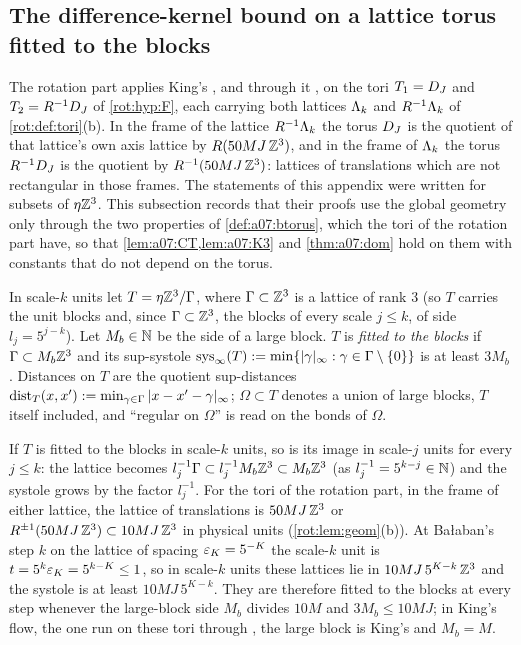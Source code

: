 
\subsection{The difference-kernel bound on a lattice torus fitted to the blocks}\label{ssec:a07:torus}

The rotation part applies King's \cite[Thm.~3.1]{K1}, and through it \BALint, on the tori $T_1=D_J$ and $T_2=R^{-1}D_J$ of \cref{rot:hyp:F}, each carrying both lattices $\Lambda_k$ and $R^{-1}\Lambda_k$ of \cref{rot:def:tori}(b). In the frame of the lattice $R^{-1}\Lambda_k$ the torus $D_J$ is the quotient of that lattice's own axis lattice by $R(50MJ\,\mathbb Z^3)$, and in the frame of $\Lambda_k$ the torus $R^{-1}D_J$ is the quotient by $R^{-1}(50MJ\,\mathbb Z^3)$: lattices of translations which are not rectangular in those frames. The statements of this appendix were written for subsets of $\eta\mathbb Z^3$. This subsection records that their proofs use the global geometry only through the two properties of \cref{def:a07:btorus}, which the tori of the rotation part have, so that \cref{lem:a07:CT,lem:a07:K3} and \cref{thm:a07:dom} hold on them with constants that do not depend on the torus.

\begin{definition}\label{def:a07:btorus}
In scale-$k$ units let $T=\eta\mathbb Z^3/\Gamma$, where $\Gamma\subset\mathbb Z^3$ is a lattice of rank $3$ (so $T$ carries the unit blocks and, since $\Gamma\subset\mathbb Z^3$, the blocks of every scale $j\le k$, of side $l_j=5^{j-k}$). Let $M_b\in\mathbb N$ be the side of a large block. $T$ is \emph{fitted to the blocks} if $\Gamma\subset M_b\mathbb Z^3$ and its sup-systole $\mathrm{sys}_\infty(T):=\min\{|\gamma|_\infty:\gamma\in\Gamma\setminus\{0\}\}$ is at least $3M_b$. Distances on $T$ are the quotient sup-distances $\operatorname{dist}_T(x,x'):=\min_{\gamma\in\Gamma}|x-x'-\gamma|_\infty$; $\Omega\subset T$ denotes a union of large blocks, $T$ itself included, and ``regular on $\Omega$'' is \cite[(2.23)]{Ba1} read on the bonds of $\Omega$.
\end{definition}
If $T$ is fitted to the blocks in scale-$k$ units, so is its image in scale-$j$ units for every $j\le k$: the lattice becomes $l_j^{-1}\Gamma\subset l_j^{-1}M_b\mathbb Z^3\subset M_b\mathbb Z^3$ (as $l_j^{-1}=5^{k-j}\in\mathbb N$) and the systole grows by the factor $l_j^{-1}$. For the tori of the rotation part, in the frame of either lattice, the lattice of translations is $50MJ\,\mathbb Z^3$ or $R^{\pm1}(50MJ\,\mathbb Z^3)\subset10MJ\,\mathbb Z^3$ in physical units (\cref{rot:lem:geom}(b)). At Ba{\l}aban's step $k$ on the lattice of spacing $\varepsilon_K=5^{-K}$ the scale-$k$ unit is $t=5^k\varepsilon_K=5^{k-K}\le1$, so in scale-$k$ units these lattices lie in $10MJ\,5^{K-k}\,\mathbb Z^3$ and the systole is at least $10MJ\,5^{K-k}$. They are therefore fitted to the blocks at every step whenever the large-block side $M_b$ divides $10M$ and $3M_b\le10MJ$; in King's flow, the one run on these tori through \cite[Thm.~3.1]{K1}, the large block is King's and $M_b=M$.

